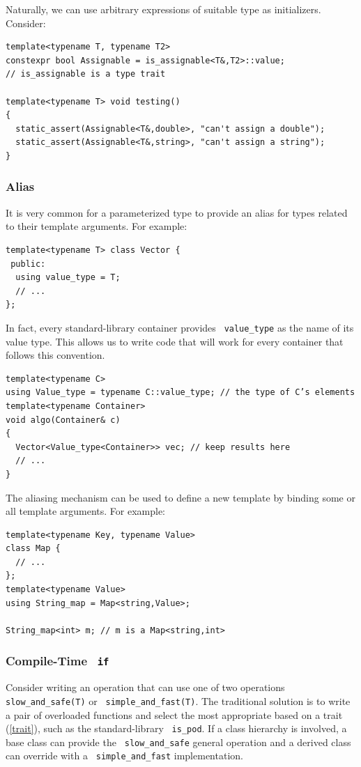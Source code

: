 \documentclass[11pt]{article}
\let\OldTexttt\texttt
\renewcommand{\texttt}[1]{\OldTexttt{\color{MidnightBlue} #1}}
\begin{document}
\label{Problem1}
Naturally, we can use arbitrary expressions of suitable type as initializers. Consider:
\begin{verbatim}
template<typename T, typename T2>
constexpr bool Assignable = is_assignable<T&,T2>::value;
// is_assignable is a type trait 

template<typename T> void testing()
{
  static_assert(Assignable<T&,double>, "can't assign a double");
  static_assert(Assignable<T&,string>, "can't assign a string");
}
\end{verbatim}
\subsubsection{Alias}
\label{sec:org31d2d5c}
It is very common for a parameterized type to provide an alias for types related to their
template arguments. For example:
\begin{verbatim}
template<typename T> class Vector {
 public:
  using value_type = T;
  // ...
};
\end{verbatim}

In fact, every standard-library container provides \texttt{value\_type} as the name of its value type.
This allows us to write code that will work for every container that follows this convention.

\begin{verbatim}
template<typename C>
using Value_type = typename C::value_type; // the type of C’s elements
template<typename Container>
void algo(Container& c)
{
  Vector<Value_type<Container>> vec; // keep results here
  // ...
}
\end{verbatim}
The aliasing mechanism can be used to define a new template by binding some or all template
arguments. For example:

\begin{verbatim}
template<typename Key, typename Value>
class Map {
  // ...
};
template<typename Value>
using String_map = Map<string,Value>;

String_map<int> m; // m is a Map<string,int>
\end{verbatim}
\subsubsection{Compile-Time \texttt{if}}
\label{sec:org182a130}
Consider writing an operation that can use one of two operations \texttt{slow\_and\_safe(T)} or
\texttt{simple\_and\_fast(T)}. The traditional solution is to write a pair of overloaded functions and
select the most appropriate based on a trait (\ref{trait}), such as the standard-library \texttt{is\_pod}.
If a class hierarchy is involved, a base class can provide the \texttt{slow\_and\_safe} general operation
and a derived class can override with a \texttt{simple\_and\_fast} implementation.
\end{document}
